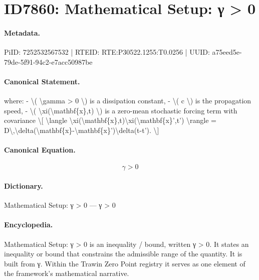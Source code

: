 \section*{ID7860: Mathematical Setup: γ > 0}
\paragraph{Metadata.}
PiID: 7252532567532 | RTEID: RTE:P30522.1255:T0.0256 | UUID: a75eed5e-79de-5f91-94c2-e7acc50987be

\paragraph{Canonical Statement.}
where: - \textbackslash{}( \textbackslash{}gamma > 0 \textbackslash{}) is a dissipation constant, - \textbackslash{}( c \textbackslash{}) is the propagation speed, - \textbackslash{}( \textbackslash{}xi(\textbackslash{}mathbf\{x\},t) \textbackslash{}) is a zero-mean stochastic forcing term with covariance \textbackslash{}[ \textbackslash{}langle \textbackslash{}xi(\textbackslash{}mathbf\{x\},t)\textbackslash{}xi(\textbackslash{}mathbf\{x\}',t') \textbackslash{}rangle = D\textbackslash{},\textbackslash{}delta(\textbackslash{}mathbf\{x\}-\textbackslash{}mathbf\{x\}')\textbackslash{}delta(t-t'). \textbackslash{}]

\paragraph{Canonical Equation.}
\[
\gamma > 0
\]

\paragraph{Dictionary.}
Mathematical Setup: γ > 0 — γ > 0

\paragraph{Encyclopedia.}
Mathematical Setup: γ > 0 is an inequality / bound, written γ > 0. It states an inequality or bound that constrains the admissible range of the quantity. It is built from γ. Within the Trawin Zero Point registry it serves as one element of the framework's mathematical narrative.
